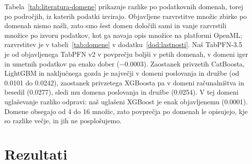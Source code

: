 \documentclass[a4paper,12pt,openright]{book}
\begin{document}


Tabela~\ref{tab:literatura-domene} prikazuje razlike po podatkovnih domenah,
torej po področjih, iz katerih podatki izvirajo. Objavljene razvrstitve množic
zbirke po domenah nismo našli, zato smo šest domen določili sami in vanje
razvrstili množice po izvoru podatkov, kot ga navaja opis množice na
platformi OpenML; razvrstitev je v
tabeli~\ref{tab:domene} v dodatku~\ref{dod:lastnosti}. Naš TabPFN-3.5 je od
objavljenega TabPFN v2 v povprečju boljši v petih domenah, v domeni iger in
umetnih podatkov pa enako dober (\num{-0.0003}). Zaostanek privzetih CatBoosta,
LightGBM in naključnega gozda je največji v domeni poslovanja in družbe (od
\num{0.0101} do \num{0.0242}), zaostanek privzetega XGBoosta pa v domeni
računalništva in besedil (\num{0.0277}), sledi mu domena poslovanja in družbe
(\num{0.0254}). V tej domeni uglaševanje razliko odpravi: naš uglašeni XGBoost
je enak objavljenemu (\num[retain-explicit-plus]{+0.0001}).
Domene obsegajo od 4 do 16 množic, zato povprečja po domenah le opisujejo, kje
so razlike večje, in jih ne posplošujemo.

\chapter{Rezultati}
\label{ch:rezultati}

\end{document}
